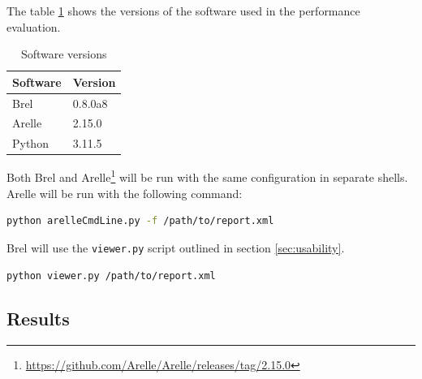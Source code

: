 
The table \ref{tab:software-versions} shows the versions of the software used in the performance evaluation.

\begin{table}[H]
    \centering
    \begin{tabular}{|l|l|}
        \hline
        \textbf{Software} & \textbf{Version} \\
        \hline
        Brel & 0.8.0a8 \\
        Arelle & 2.15.0 \\
        Python & 3.11.5 \\
        \hline
    \end{tabular}
    \caption{Software versions}
    \label{tab:software-versions}
\end{table}

Both Brel and Arelle\footnote{\url{https://github.com/Arelle/Arelle/releases/tag/2.15.0}} will be run with the same configuration in separate shells.
Arelle will be run with the following command:

\begin{lstlisting}[language=bash, basicstyle=\ttfamily\small]
python arelleCmdLine.py -f /path/to/report.xml
\end{lstlisting}

Brel will use the \texttt{viewer.py} script outlined in section \ref{sec:usability}.

\begin{lstlisting}[language=bash, basicstyle=\ttfamily\small]
python viewer.py /path/to/report.xml
\end{lstlisting}

\subsection{Results}

